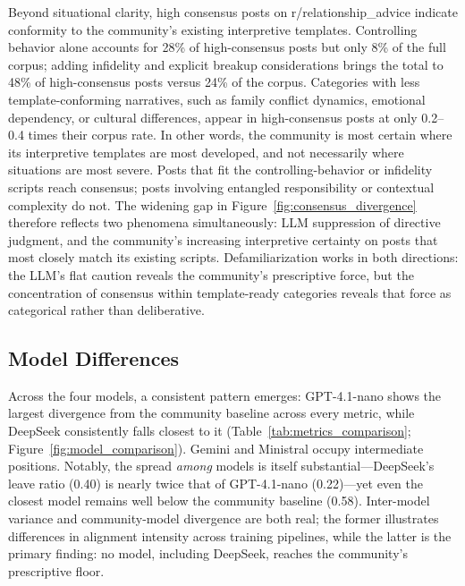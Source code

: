 Beyond situational clarity, high consensus posts on r/relationship\_advice indicate conformity to the community's existing interpretive templates. Controlling behavior alone accounts for 28\% of high-consensus posts but only 8\% of the full corpus; adding infidelity and explicit breakup considerations brings the total to 48\% of high-consensus posts versus 24\% of the corpus. Categories with less template-conforming narratives, such as family conflict dynamics, emotional dependency, or cultural differences, appear in high-consensus posts at only 0.2--0.4 times their corpus rate. In other words, the community is most certain where its interpretive templates are most developed, and not necessarily where situations are most severe. Posts that fit the controlling-behavior or infidelity scripts reach consensus; posts involving entangled responsibility or contextual complexity do not. The widening gap in Figure~\ref{fig:consensus_divergence} therefore reflects two phenomena simultaneously: LLM suppression of directive judgment, and the community's increasing interpretive certainty on posts that most closely match its existing scripts. Defamiliarization works in both directions: the LLM's flat caution reveals the community's prescriptive force, but the concentration of consensus within template-ready categories reveals that force as categorical rather than deliberative.

\subsection{Model Differences}

Across the four models, a consistent pattern emerges: GPT-4.1-nano shows the largest divergence from the community baseline across every metric, while DeepSeek consistently falls closest to it (Table~\ref{tab:metrics_comparison}; Figure~\ref{fig:model_comparison}). Gemini and Ministral occupy intermediate positions. Notably, the spread \textit{among} models is itself substantial---DeepSeek's leave ratio (0.40) is nearly twice that of GPT-4.1-nano (0.22)---yet even the closest model remains well below the community baseline (0.58). Inter-model variance and community-model divergence are both real; the former illustrates differences in alignment intensity across training pipelines, while the latter is the primary finding: no model, including DeepSeek, reaches the community's prescriptive floor.

